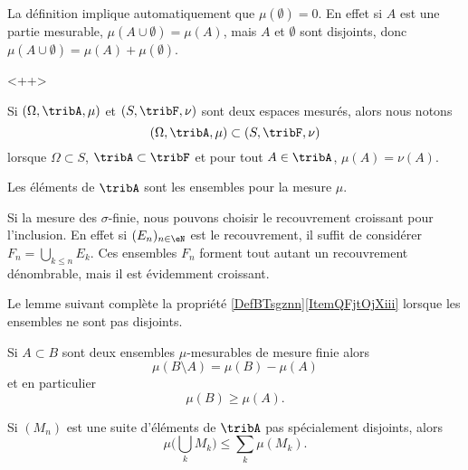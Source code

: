 \begin{remark}
    La définition implique automatiquement que \( \mu(\emptyset)=0\). En effet si \( A\) est une partie mesurable, \( \mu(A\cup \emptyset)=\mu(A)\), mais \( A\) et \( \emptyset\) sont disjoints, donc \( \mu(A\cup \emptyset)=\mu(A)+\mu(\emptyset)\).
\end{remark}
<++>

Si \( (\Omega,\tribA,\mu)\) et \( (S,\tribF,\nu)\) sont deux espaces mesurés, alors nous notons
\begin{equation}
    (\Omega,\tribA,\mu)\subset (S,\tribF,\nu)
\end{equation}
lorsque \( \Omega\subset S\), \( \tribA\subset\tribF\) et pour tout \( A\in\tribA\), \( \mu(A)=\nu(A)\).

\begin{definition}\label{DefHGsQxHB}
    Les éléments de \( \tribA\) sont les ensembles  pour la mesure \( \mu\).
\end{definition}

Si la mesure des \( \sigma\)-finie, nous pouvons choisir le recouvrement croissant pour l'inclusion. En effet si \( (E_n)_{n\in \eN}\) est le recouvrement, il suffit de considérer \( F_n=\bigcup_{k\leq n}E_k\). Ces ensembles \( F_n\) forment tout autant un recouvrement dénombrable, mais il est évidemment croissant.

Le lemme suivant complète la propriété \ref{DefBTsgznn}\ref{ItemQFjtOjXiii} lorsque les ensembles ne sont pas disjoints.
\begin{lemma} \label{LemPMprYuC}
    Si \( A\subset B\) sont deux ensembles \( \mu\)-mesurables de mesure finie alors
    \begin{equation}
        \mu(B\setminus A)=\mu(B)-\mu(A)
    \end{equation}
    et en particulier
    \begin{equation}
        \mu(B)\geq \mu(A).
    \end{equation}

    Si \( (M_n)\) est une suite d'éléments de \( \tribA\) pas spécialement disjoints, alors
    \begin{equation}\label{EqWWFooYPCTt}
        \mu\big( \bigcup_kM_k \big)\leq \sum_{k}\mu(M_k).
    \end{equation}
\end{lemma}

